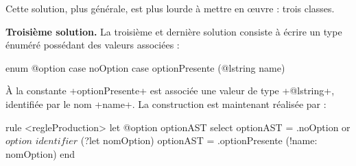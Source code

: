 Cette solution, plus générale, est plus lourde à mettre en œuvre : trois classes.

\textbf{Troisième solution.} La troisième et dernière solution consiste à écrire un type énuméré possédant des valeurs associées :

\begin{galgas4}
enum @option {
  case noOption
  case optionPresente (@lstring name)
}
\end{galgas4}

À la constante \ggsq+optionPresente+ est associée une valeur de type \ggsq+@lstring+, identifiée par le nom \ggsq+name+. La construction est maintenant réalisée par :
\begin{galgas4}
rule <regleProduction> {
  let @option optionAST
  select
    optionAST = .noOption
  or
    $option$
    $identifier$ (?let nomOption)
    optionAST = .optionPresente (!name: nomOption)
  end
}
\end{galgas4}












